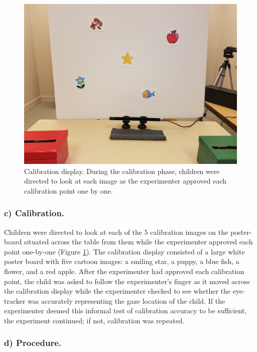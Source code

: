 \documentclass[floatsintext,man]{apa6}
\theoremstyle{definition}
\theoremstyle{definition}
\theoremstyle{definition}
\theoremstyle{remark}
\begin{document}
\begin{figure}
\centering
\includegraphics{../images/calibration.jpg}
\caption{\label{fig:calibration}Calibration display. During the calibration
phase, children were directed to look at each image as the experimenter
approved each calibration point one by one.}
\end{figure}

\subsubsection{c) Calibration.}\label{c-calibration.}

Children were directed to look at each of the 5 calibration images on
the poster-board situated across the table from them while the
experimenter approved each point one-by-one (Figure
\ref{fig:calibration}). The calibration display consisted of a large
white poster board with five cartoon images: a smiling star, a puppy, a
blue fish, a flower, and a red apple. After the experimenter had
approved each calibration point, the child was asked to follow the
experimenter's finger as it moved across the calibration display while
the experimenter checked to see whether the eye-tracker was accurately
representing the gaze location of the child. If the experimenter deemed
this informal test of calibration accuracy to be sufficient, the
experiment continued; if not, calibration was repeated.

\subsubsection{d) Procedure.}\label{d-procedure.}
\end{document}
